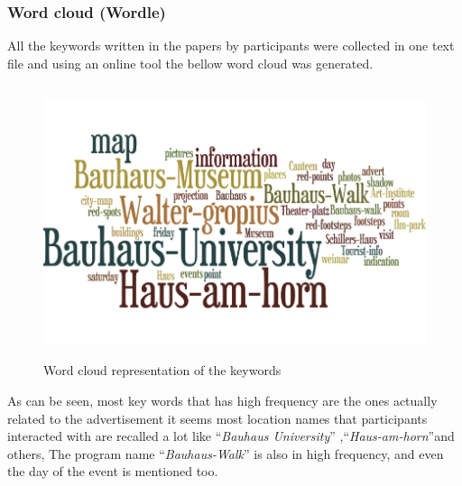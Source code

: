 \subsubsection{Word cloud (Wordle)}
All the keywords written in the papers by participants were collected in one text file and using an online tool \cite{wordle} the bellow word cloud was generated.

\begin{figure}[H]
\centering
\includegraphics[width=12cm,height=8cm]{Figures/6/wordle}%
 \caption{Word cloud representation of the keywords}%
 \label{fig:wordle}%
\end{figure}

As can be seen, most key words that has high frequency are the ones actually related to the advertisement it seems most location names that participants interacted with are recalled a lot like ``\emph{Bauhaus University}'' ,``\emph{Haus-am-horn}''and others, The program name ``\emph{Bauhaus-Walk}'' is also in high frequency, and even the day of the event is mentioned too.


